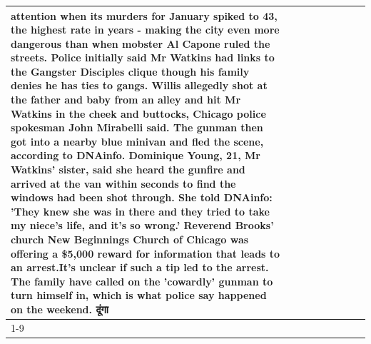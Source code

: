 \begin{table}[H]
\begin{tabular}{lllrlllll}
attention when its murders for January spiked to 43, the highest rate in years - making the city even more dangerous than when mobster Al Capone ruled the streets. Police initially said Mr Watkins had links to the Gangster Disciples clique though his family denies he has ties to gangs. Willis allegedly shot at the father and baby from an alley and hit Mr Watkins in the cheek and buttocks, Chicago police spokesman John Mirabelli said. The gunman then got into a nearby blue minivan and fled the scene, according to DNAinfo. Dominique Young, 21, Mr Watkins' sister, said she heard the gunfire and arrived at the van within seconds to find the windows had been shot through. She told DNAinfo: 'They knew she was in there and they tried to take my niece's life, and it's so wrong.' Reverend Brooks' church New Beginnings Church of Chicago was offering a \$5,000 reward for information that leads to an arrest.It's unclear if such a tip led to the arrest. The family have called on the 'cowardly' gunman to turn himself in, which is what police say happened on the weekend. दूंगा \\
\cline{1-9}

\end{tabular}
\end{table}
